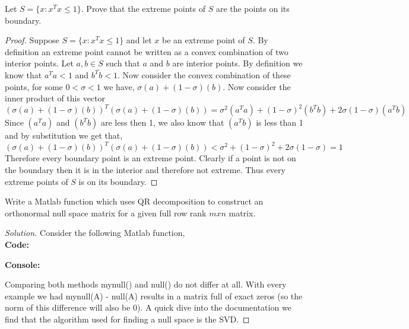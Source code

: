 \documentclass[12pt]{article}
\makeatletter
\theoremstyle{homework}
\newenvironment{exercise}[1]
{\def\@currentlabel{#1}\exercisecore}
{\endexercisecore}
\makeatother
\begin{document}
\begin{exercise}{3.16} Let $S = \{x:x^Tx\leq 1\}.$ Prove that the extreme points of $S$
  are the points on its boundary. 
  \begin{proof} Suppose $S = \{x:x^Tx\leq 1\}$ and let $x$ be an extreme point of $S$. By definition 
    an extreme point cannot be written as a convex combination of two interior points. Let $a, b \in S$
    such that $a$ and $b$ are interior points. By definition we know that $a^Ta < 1$ and $b^Tb < 1$. Now consider 
    the convex combination of these points, for some $0 < \sigma < 1$ we have, $\sigma(a) + (1 - \sigma)(b)$. Now consider the 
    inner product of this vector
    \begin{equation}
      (\sigma(a) + (1 - \sigma)(b))^T(\sigma(a) + (1 - \sigma)(b)) = \sigma^2(a^Ta) + (1 - \sigma)^2(b^Tb) + 2\sigma(1 - \sigma)(a^Tb)
    \end{equation}  
    Since $(a^Ta)$ and $(b^Tb)$ are less then 1, we also know that $(a^Tb)$ is less than 1 and by substitution we get that, 
    \begin{equation}
      (\sigma(a) + (1 - \sigma)(b))^T(\sigma(a) + (1 - \sigma)(b)) < \sigma^2 + (1 - \sigma)^2 + 2\sigma(1 - \sigma) = 1
    \end{equation}
    Therefore every boundary point is an extreme point. Clearly if a point is not on the boundary then it is in the interior and therefore not extreme. 
    Thus every extreme points of $S$ is on its boundary.
  \end{proof}
\end{exercise}
\vspace{.5in}



\begin{exercise}{Problem P9} Write a Matlab function which uses QR decomposition to construct an orthonormal null space matrix 
  for a given full row rank $mxn$ matrix. 
  \begin{proof}[Solution] Consider the following Matlab function, \\
    \textbf{Code:}
    \begin{center}
      
    \end{center}
    \textbf{Console:}
    \begin{center}
      
    \end{center}
    \vspace{.15in}
    Comparing both methods mynull() and null() do not differ at all. With every example we had mynull(A) - null(A) results in 
    a matrix full of exact zeros (so the norm of this difference will also be 0). A quick dive into the documentation we find that 
    the algorithm used for finding a null space is the SVD. 
  \end{proof} 



\end{exercise}
\end{document}
